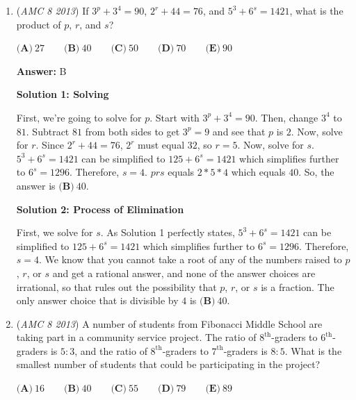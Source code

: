 \begin{enumerate}
\textbf{Solution 2}

We can list out all the combinations and we get this: $GG, GY, GR_1, GR_2, RG, RY, RR_1, RR_2$. There is a total of 8 combinations and 3 that are the same. Hence, we yield the answer $\boxed{\textbf{C}}$.

 


	\item (\textit{AMC 8 2013}) If $3^p + 3^4 = 90$, $2^r + 44 = 76$, and $5^3 + 6^s = 1421$, what is the product of $p$, $r$, and $s$?


 $\textbf{(A)}\ 27 \qquad \textbf{(B)}\ 40 \qquad \textbf{(C)}\ 50 \qquad \textbf{(D)}\ 70 \qquad \textbf{(E)}\ 90$

 \textbf{Answer: }B



\textbf{Solution 1: Solving}

First, we're going to solve for $p$. Start with $3^p+3^4=90$. Then, change $3^4$ to $81$. Subtract $81$ from both sides to get $3^p=9$ and see that $p$ is $2$. Now, solve for $r$. Since $2^r+44=76$, $2^r$ must equal $32$, so $r=5$. Now, solve for $s$. $5^3+6^s=1421$ can be simplified to $125+6^s=1421$ which simplifies further to $6^s=1296$. Therefore, $s=4$. $prs$ equals $2*5*4$ which equals $40$. So, the answer is $\boxed{\textbf{(B)}\ 40}$.

 



\textbf{Solution 2: Process of Elimination}

First, we solve for $s$. As Solution 1 perfectly states, $5^3+6^s=1421$ can be simplified to $125+6^s=1421$ which simplifies further to $6^s=1296$. Therefore, $s=4$. We know that you cannot take a root of any of the numbers raised to $p$, $r$, or $s$ and get a rational answer, and none of the answer choices are irrational, so that rules out the possibility that $p$, $r$, or $s$ is a fraction. The only answer choice that is divisible by $4$ is $\boxed{\textbf{(B)}\ 40}$.

 


	\item (\textit{AMC 8 2013}) A number of students from Fibonacci Middle School are taking part in a community service project. The ratio of $8^\text{th}$-graders to $6^\text{th}$-graders is $5:3$, and the ratio of $8^\text{th}$-graders to $7^\text{th}$-graders is $8:5$. What is the smallest number of students that could be participating in the project?


 $\textbf{(A)}\ 16 \qquad \textbf{(B)}\ 40 \qquad \textbf{(C)}\ 55 \qquad \textbf{(D)}\ 79 \qquad \textbf{(E)}\ 89$


\end{enumerate}
